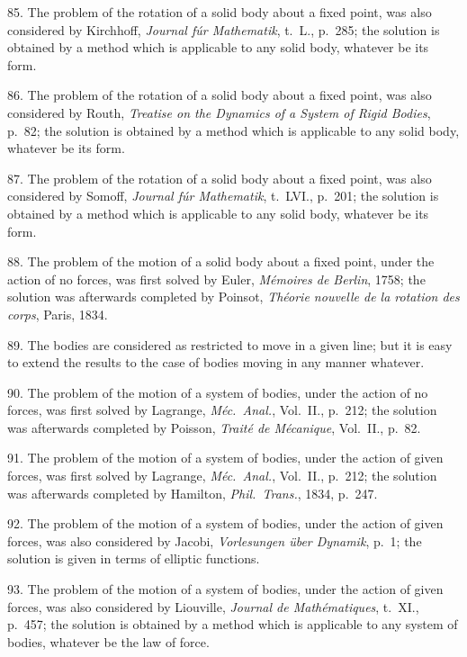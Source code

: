 \documentclass[11pt,a4paper]{book}
\begin{document}
85. The problem of the rotation of a solid body about a fixed point, was also considered by Kirchhoff, \textit{Journal f\'ur Mathematik}, t.~L., p.~285; the solution is obtained by a method which is applicable to any solid body, whatever be its form.

86. The problem of the rotation of a solid body about a fixed point, was also considered by Routh, \textit{Treatise on the Dynamics of a System of Rigid Bodies}, p.~82; the solution is obtained by a method which is applicable to any solid body, whatever be its form.

87. The problem of the rotation of a solid body about a fixed point, was also considered by Somoff, \textit{Journal f\'ur Mathematik}, t.~LVI., p.~201; the solution is obtained by a method which is applicable to any solid body, whatever be its form.

88. The problem of the motion of a solid body about a fixed point, under the action of no forces, was first solved by Euler, \textit{M\'emoires de Berlin}, 1758; the solution was afterwards completed by Poinsot, \textit{Th\'eorie nouvelle de la rotation des corps}, Paris, 1834.

89. The bodies are considered as restricted to move in a given line; but it is easy to extend the results to the case of bodies moving in any manner whatever.

90. The problem of the motion of a system of bodies, under the action of no forces, was first solved by Lagrange, \textit{M\'ec.\ Anal.}, Vol.~II., p.~212; the solution was afterwards completed by Poisson, \textit{Trait\'e de M\'ecanique}, Vol.~II., p.~82.

\newpage
\setcounter{page}{545}

91. The problem of the motion of a system of bodies, under the action of given forces, was first solved by Lagrange, \textit{M\'ec.\ Anal.}, Vol.~II., p.~212; the solution was afterwards completed by Hamilton, \textit{Phil.\ Trans.}, 1834, p.~247.

92. The problem of the motion of a system of bodies, under the action of given forces, was also considered by Jacobi, \textit{Vorlesungen \"uber Dynamik}, p.~1; the solution is given in terms of elliptic functions.

93. The problem of the motion of a system of bodies, under the action of given forces, was also considered by Liouville, \textit{Journal de Math\'ematiques}, t.~XI., p.~457; the solution is obtained by a method which is applicable to any system of bodies, whatever be the law of force.
\end{document}
